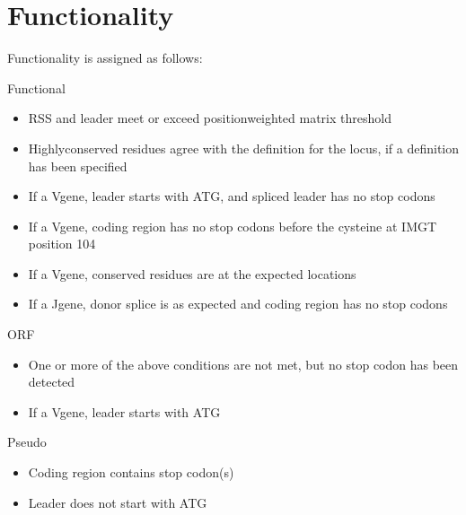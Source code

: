 \documentclass[letterpaper,10pt,english]{sphinxmanual}
\begin{document}
\section{Functionality}
\label{\detokenize{tools/annotation:functionality}}
\sphinxAtStartPar
Functionality is assigned as follows:

\sphinxAtStartPar
Functional
\begin{itemize}
\item {} 
\sphinxAtStartPar
RSS and leader meet or exceed position\sphinxhyphen{}weighted matrix threshold

\item {} 
\sphinxAtStartPar
Highly\sphinxhyphen{}conserved residues agree with the definition for the locus, if a definition has been specified

\item {} 
\sphinxAtStartPar
If a V\sphinxhyphen{}gene, leader starts with ATG, and spliced leader has no stop codons

\item {} 
\sphinxAtStartPar
If a V\sphinxhyphen{}gene, coding region has no stop codons before the cysteine at IMGT position 104

\item {} 
\sphinxAtStartPar
If a V\sphinxhyphen{}gene, conserved residues are at the expected locations

\item {} 
\sphinxAtStartPar
If a J\sphinxhyphen{}gene, donor splice is as expected and coding region has no stop codons

\end{itemize}

\sphinxAtStartPar
ORF
\begin{itemize}
\item {} 
\sphinxAtStartPar
One or more of the above conditions are not met, but no stop codon has been detected

\item {} 
\sphinxAtStartPar
If a V\sphinxhyphen{}gene, leader starts with ATG

\end{itemize}

\sphinxAtStartPar
Pseudo
\begin{itemize}
\item {} 
\sphinxAtStartPar
Coding region contains stop codon(s)

\item {} 
\sphinxAtStartPar
Leader does not start with ATG

\end{itemize}
\end{document}
